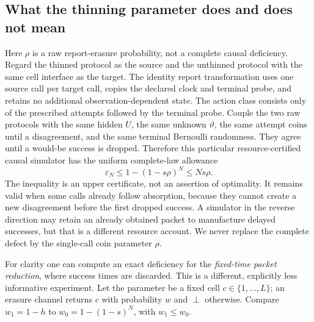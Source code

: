\subsection{What the thinning parameter does and does not mean}
Here $\rho$ is a raw report-erasure probability, not a complete causal deficiency. Regard the thinned protocol as the source and the unthinned protocol with the same cell interface as the target. The identity report transformation uses one source call per target call, copies the declared clock and terminal probe, and retains no additional observation-dependent state. The action class consists only of the prescribed attempts followed by the terminal probe. Couple the two raw protocols with the same hidden $U$, the same unknown $\vartheta$, the same attempt coins until a disagreement, and the same terminal Bernoulli randomness. They agree until a would-be success is dropped. Therefore this particular resource-certified causal simulator has the uniform complete-law allowance
\begin{equation}\label{eq:thinning-path}
 \varepsilon_N\le1-(1-s\rho)^N\le Ns\rho.
\end{equation}
The inequality is an upper certificate, not an assertion of optimality. It remains valid when some calls already follow absorption, because they cannot create a new disagreement before the first dropped success. A simulator in the reverse direction may retain an already obtained packet to manufacture delayed successes, but that is a different resource account. We never replace the complete defect by the single-call coin parameter $\rho$.

For clarity one can compute an exact deficiency for the \emph{fixed-time packet reduction}, where success times are discarded. This is a different, explicitly less informative experiment. Let the parameter be a fixed cell $c\in\{1,\ldots,L\}$; an erasure channel returns $c$ with probability $w$ and $\perp$ otherwise. Compare $w_1=1-h$ to $w_0=1-(1-s)^N$, with $w_1\le w_0$.

